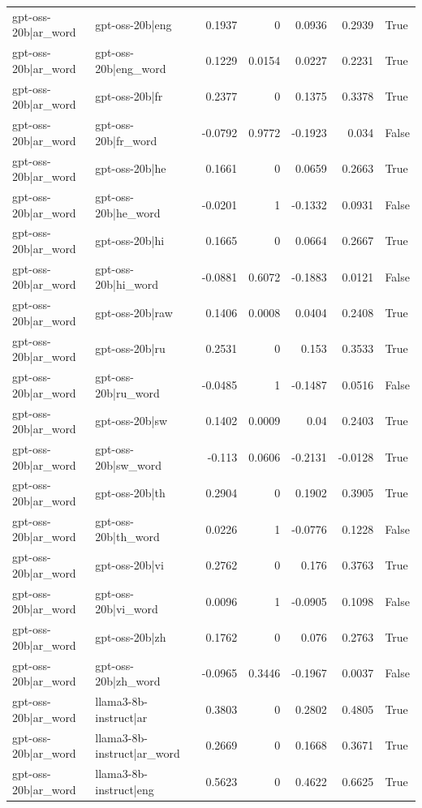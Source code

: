 \begin{table}
\begin{tabular}{l l r r r r l}
gpt-oss-20b|ar_word & gpt-oss-20b|eng & 0.1937 & 0 & 0.0936 & 0.2939 & True \\
gpt-oss-20b|ar_word & gpt-oss-20b|eng_word & 0.1229 & 0.0154 & 0.0227 & 0.2231 & True \\
gpt-oss-20b|ar_word & gpt-oss-20b|fr & 0.2377 & 0 & 0.1375 & 0.3378 & True \\
gpt-oss-20b|ar_word & gpt-oss-20b|fr_word & -0.0792 & 0.9772 & -0.1923 & 0.034 & False \\
gpt-oss-20b|ar_word & gpt-oss-20b|he & 0.1661 & 0 & 0.0659 & 0.2663 & True \\
gpt-oss-20b|ar_word & gpt-oss-20b|he_word & -0.0201 & 1 & -0.1332 & 0.0931 & False \\
gpt-oss-20b|ar_word & gpt-oss-20b|hi & 0.1665 & 0 & 0.0664 & 0.2667 & True \\
gpt-oss-20b|ar_word & gpt-oss-20b|hi_word & -0.0881 & 0.6072 & -0.1883 & 0.0121 & False \\
gpt-oss-20b|ar_word & gpt-oss-20b|raw & 0.1406 & 0.0008 & 0.0404 & 0.2408 & True \\
gpt-oss-20b|ar_word & gpt-oss-20b|ru & 0.2531 & 0 & 0.153 & 0.3533 & True \\
gpt-oss-20b|ar_word & gpt-oss-20b|ru_word & -0.0485 & 1 & -0.1487 & 0.0516 & False \\
gpt-oss-20b|ar_word & gpt-oss-20b|sw & 0.1402 & 0.0009 & 0.04 & 0.2403 & True \\
gpt-oss-20b|ar_word & gpt-oss-20b|sw_word & -0.113 & 0.0606 & -0.2131 & -0.0128 & True \\
gpt-oss-20b|ar_word & gpt-oss-20b|th & 0.2904 & 0 & 0.1902 & 0.3905 & True \\
gpt-oss-20b|ar_word & gpt-oss-20b|th_word & 0.0226 & 1 & -0.0776 & 0.1228 & False \\
gpt-oss-20b|ar_word & gpt-oss-20b|vi & 0.2762 & 0 & 0.176 & 0.3763 & True \\
gpt-oss-20b|ar_word & gpt-oss-20b|vi_word & 0.0096 & 1 & -0.0905 & 0.1098 & False \\
gpt-oss-20b|ar_word & gpt-oss-20b|zh & 0.1762 & 0 & 0.076 & 0.2763 & True \\
gpt-oss-20b|ar_word & gpt-oss-20b|zh_word & -0.0965 & 0.3446 & -0.1967 & 0.0037 & False \\
gpt-oss-20b|ar_word & llama3-8b-instruct|ar & 0.3803 & 0 & 0.2802 & 0.4805 & True \\
gpt-oss-20b|ar_word & llama3-8b-instruct|ar_word & 0.2669 & 0 & 0.1668 & 0.3671 & True \\
gpt-oss-20b|ar_word & llama3-8b-instruct|eng & 0.5623 & 0 & 0.4622 & 0.6625 & True \\

\end{tabular}
\end{table}
